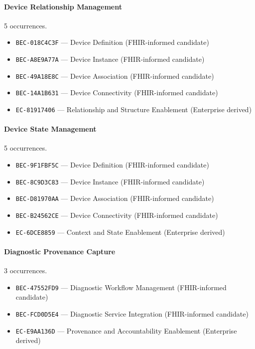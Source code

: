 \documentclass[11pt,a4paper,openany]{book}
\begin{document}
\paragraph{Device Relationship Management} 5 occurrences.\par
\begin{itemize}
\item \texttt{BEC-018C4C3F} --- Device Definition (FHIR-informed candidate)
\item \texttt{BEC-A8E9A77A} --- Device Instance (FHIR-informed candidate)
\item \texttt{BEC-49A18E8C} --- Device Association (FHIR-informed candidate)
\item \texttt{BEC-14A1B631} --- Device Connectivity (FHIR-informed candidate)
\item \texttt{EC-81917406} --- Relationship and Structure Enablement (Enterprise derived)
\end{itemize}
\paragraph{Device State Management} 5 occurrences.\par
\begin{itemize}
\item \texttt{BEC-9F1FBF5C} --- Device Definition (FHIR-informed candidate)
\item \texttt{BEC-8C9D3C83} --- Device Instance (FHIR-informed candidate)
\item \texttt{BEC-D81970AA} --- Device Association (FHIR-informed candidate)
\item \texttt{BEC-B24562CE} --- Device Connectivity (FHIR-informed candidate)
\item \texttt{EC-6DCE8859} --- Context and State Enablement (Enterprise derived)
\end{itemize}
\paragraph{Diagnostic Provenance Capture} 3 occurrences.\par
\begin{itemize}
\item \texttt{BEC-47552FD9} --- Diagnostic Workflow Management (FHIR-informed candidate)
\item \texttt{BEC-FCD0D5E4} --- Diagnostic Service Integration (FHIR-informed candidate)
\item \texttt{EC-E9AA136D} --- Provenance and Accountability Enablement (Enterprise derived)
\end{itemize}
\end{document}
